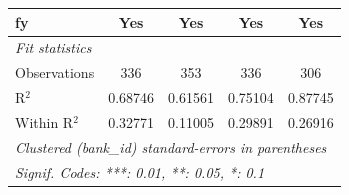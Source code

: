 \begin{tabular}{lcccc}
   fy                     & Yes             & Yes               & Yes             & Yes\\  
   \midrule
   \emph{Fit statistics}\\
   Observations           & 336             & 353               & 336             & 306\\  
   R$^2$                  & 0.68746         & 0.61561           & 0.75104         & 0.87745\\  
   Within R$^2$           & 0.32771         & 0.11005           & 0.29891         & 0.26916\\  
   \midrule \midrule
   \multicolumn{5}{l}{\emph{Clustered (bank\_id) standard-errors in parentheses}}\\
   \multicolumn{5}{l}{\emph{Signif. Codes: ***: 0.01, **: 0.05, *: 0.1}}\\
\end{tabular}
\par\endgroup


